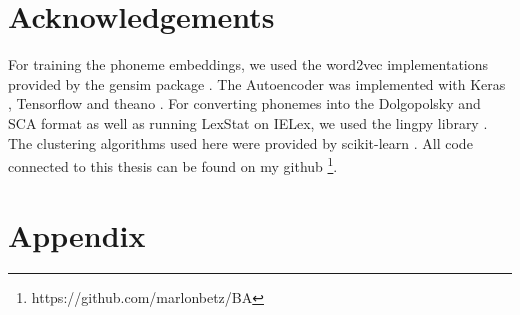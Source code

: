 \documentclass[6pt]{article}
\begin{document}
\section{Acknowledgements}
For training the phoneme embeddings, we used the word2vec implementations provided by the gensim package \citep{rehurek_lrec}. The Autoencoder was implemented with Keras \citep{chollet2015keras}, Tensorflow \citep{tensorflow2015-whitepaper} and theano \citep{2016arXiv160502688short}. For converting phonemes into the Dolgopolsky and SCA format as well as running LexStat on IELex, we used the lingpy library \citep{List2016e}. The clustering algorithms used here were provided by scikit-learn \citep{scikit-learn}. All code connected to this thesis can be found on my github \footnote{https://github.com/marlonbetz/BA}.


\appendix
\section{Appendix} \label{App:Appendix}
\end{document}

